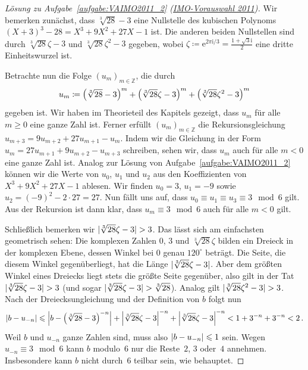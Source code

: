 \begin{proof}[Lösung zu Aufgabe~\ref{aufgabe:VAIMO2011_2} \textmd{(\href{https://www.mathe-wettbewerbe.de/fileadmin/Mathe-Wettbewerbe/AIMO/Aufgaben_und_Loesungen_AIMO/aufgaben_awb_11.pdf}{IMO-Vorauswahl 2011})}]
	Wir bemerken zunächst, dass $\sqrt[3]{28}-3$ eine Nullstelle des kubischen Polynoms $(X+3)^3-28=X^3+9X^2+27X-1$ ist. Die anderen beiden Nullstellen sind durch $\sqrt[3]{28}\zeta-3$ und $\sqrt[3]{28}\zeta^2-3$ gegeben, wobei $\zeta\coloneqq \mathrm{e}^{2\pi\mathrm{i}/3}=\frac{1+\sqrt{3}\mathrm{i}}{2}$ eine dritte Einheitswurzel ist.
	
	Betrachte nun die Folge $(u_m)_{m\in\mathbb Z}$, die durch
	\begin{equation*}
		u_m\coloneqq \parens*{\sqrt[3]{28}-3}^m+\parens*{\sqrt[3]{28}\zeta-3}^m+\parens*{\sqrt[3]{28}\zeta^2-3}^m
	\end{equation*}
	gegeben ist. Wir haben im Theorieteil des Kapitels gezeigt, dass $u_m$ für alle $m\geqslant 0$ eine ganze Zahl ist. Ferner erfüllt $(u_m)_{m\in\mathbb Z}$ die Rekursionsgleichung $u_{m+3}=9u_{m+2}+27u_{m+1}-u_m$. Indem wir die Gleichung in der Form $u_{m}=27u_{m+1}+9u_{m+2}-u_{m+3}$ schreiben, sehen wir, dass $u_m$ auch für alle $m<0$ eine ganze Zahl ist. Analog zur Lösung von Aufgabe~\ref{aufgabe:VAIMO2011_2} können wir die Werte von $u_0$, $u_1$ und $u_2$ aus den Koeffizienten von $X^3+9X^2+27X-1$ ablesen. Wir finden $u_0=3$, $u_1=-9$ sowie $u_2=(-9)^2-2\cdot 27=27$. Nun fällt uns auf, dass $u_0\equiv u_1\equiv u_3\equiv 3\mod 6$ gilt. Aus der Rekursion ist dann klar, dass $u_m\equiv 3\mod 6$ auch für alle $m<0$ gilt.
	
	Schließlich bemerken wir $\abs{\sqrt[3]{28}\zeta-3}>3$. Das lässt sich am einfachsten geometrisch sehen: Die komplexen Zahlen $0$, $3$ und $\sqrt[3]{28}\zeta$ bilden ein Dreieck in der komplexen Ebene, dessen Winkel bei $0$ genau $120^\circ$ beträgt. Die Seite, die diesem Winkel gegenüberliegt, hat die Länge $\abs{\sqrt[3]{28}\zeta-3}$. Aber dem größten Winkel eines Dreiecks liegt stets die größte Seite gegenüber, also gilt in der Tat $\abs{\sqrt[3]{28}\zeta-3}>3$ (und sogar $\abs{\sqrt[3]{28}\zeta-3}>\sqrt[3]{28}$). Analog gilt $\abs{\sqrt[3]{28}\zeta^2-3}>3$. Nach der Dreiecksungleichung und der Definition von $b$ folgt nun
	\begin{equation*}
		\abs*{b-u_{-n}}\leqslant \abs[\Big]{b-\parens*{\sqrt[3]{28}-3}^{-n}}+\abs*{\sqrt[3]{28}\zeta-3}^{-n}+\abs*{\sqrt[3]{28}\zeta-3}^{-n}<1+3^{-n}+3^{-n}<2\,.
	\end{equation*}
	Weil $b$ und $u_{-n}$ ganze Zahlen sind, muss also $\abs*{b-u_{-n}}\leqslant 1$ sein. Wegen $u_{-n}\equiv 3\mod 6$ kann $b$ modulo~$6$ nur die Reste~$2$, $3$ oder~$4$ annehmen. Insbesondere kann $b$ nicht durch~$6$ teilbar sein, wie behauptet.
\end{proof}